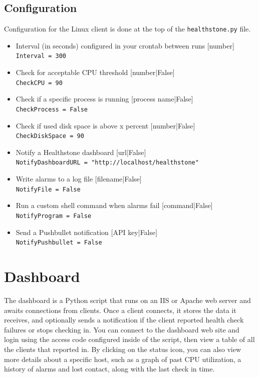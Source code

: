 \documentclass[11pt]{article}
\begin{document}
\subsection{Configuration}

Configuration for the Linux client is done at the top of the \texttt{healthstone.py} file.

\begin{itemize}
\item Interval (in seconds) configured in your crontab between runs [number]\\
\texttt{Interval = 300}
\item Check for acceptable CPU threshold [number|False]\\
\texttt{CheckCPU = 90}
\item Check if a specific process is running [process name|False]\\
\texttt{CheckProcess = False}
\item Check if used disk space is above x percent [number|False]\\
\texttt{CheckDiskSpace = 90}
\item Notify a Healthstone dashboard [url|False]\\
\texttt{NotifyDashboardURL = "http://localhost/healthstone"}
\item Write alarms to a log file [filename|False]\\
\texttt{NotifyFile = False}
\item Run a custom shell command when alarms fail [command|False]\\
\texttt{NotifyProgram = False}
\item Send a Pushbullet notification [API key|False]\\
\texttt{NotifyPushbullet = False}
\end{itemize}


\section{Dashboard}

The dashboard is a Python script that runs on an IIS or Apache web server and awaits connections from clients. Once a client connects, it stores the data it receives, and optionally sends a notification if the client reported health check failures or stops checking in. You can connect to the dashboard web site and login using the access code configured inside of the script, then view a table of all the clients that reported in. By clicking on the status icon, you can also view more details about a specific host, such as a graph of past CPU utilization, a history of alarms and lost contact, along with the last check in time.
\end{document}
